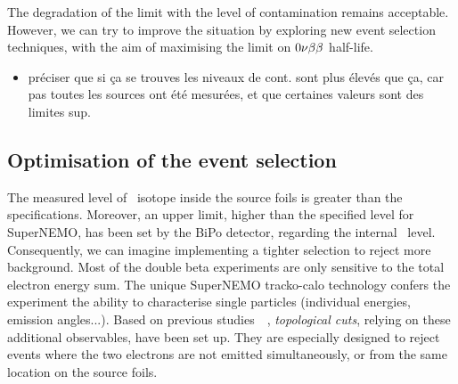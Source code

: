 The degradation of the limit with the level of contamination remains acceptable.
However, we can try to improve the situation by exploring new event selection techniques, with the aim of maximising the limit on $0\nu\beta\beta$ half-life.

\begin{itemize}
\item préciser que si ça se trouves les niveaux de cont. sont plus élevés que ça, car pas toutes les sources ont été mesurées, et que certaines valeurs sont des limites sup.
\end{itemize}

\subsection{Optimisation of the event selection}
\label{subsec:opti_ev_selection}

The measured level of \Tl\ isotope inside the source foils is greater than the specifications.
Moreover, an upper limit, higher than the specified level for SuperNEMO, has been set by the BiPo detector, regarding the internal \Bi\ level.
Consequently, we can imagine implementing a tighter selection to reject more background.
Most of the double beta experiments are only sensitive to the total electron energy sum.
The unique SuperNEMO tracko-calo technology confers the experiment the ability to characterise single particles (individual energies, emission angles...).
Based on previous studies~\cite{CalvezThesis}~\cite{ChaponThesis}, \emph{topological cuts}, relying on these additional observables, have been set up.
They are especially designed to reject events where the two electrons are not emitted simultaneously, or from the same location on the source foils.

